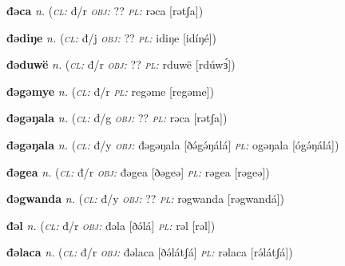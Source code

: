 \newentry
\headword\textbf{đəca}  
\ipa{[ðətʃa]}
\synpos\textit{n.} 
\class(\textit{\textsc{cl:}} {đ/r}
\object\textit{\textsc{obj:}} ??
\plural\textit{\textsc{pl:}} rəca [rətʃa])

\newentry
\headword\textbf{đədiŋe}  
\ipa{[ðədíŋé]}
\synpos\textit{n.} 
\class(\textit{\textsc{cl:}} {đ/j}
\object\textit{\textsc{obj:}} ??
\plural\textit{\textsc{pl:}} idiŋe [idíŋé])

\newentry
\headword\textbf{đəduwë}  
\ipa{[ðədúwɜ́]}
\synpos\textit{n.} 
\class(\textit{\textsc{cl:}} {đ/r}
\object\textit{\textsc{obj:}} ??
\plural\textit{\textsc{pl:}} rduwë [rdúwɜ́])

\newentry
\headword\textbf{đəgəmye}  
\ipa{[ðəgəmjé]}
\synpos\textit{n.} 
\class(\textit{\textsc{cl:}} {đ/r} %
\plural\textit{\textsc{pl:}} regəme [regəme])

\newentry
\headword\textbf{đəgəŋala}  
\ipa{[ðəgəŋala]}
\synpos\textit{n.} 
\class(\textit{\textsc{cl:}} {đ/g}
\object\textit{\textsc{obj:}} ??
\plural\textit{\textsc{pl:}} rəca [rətʃa])

\newentry
\headword\textbf{đəgəŋala}  
\ipa{[ðə́gə́ŋálá]}
\synpos\textit{n.} 
\class(\textit{\textsc{cl:}} {đ/y}
\object\textit{\textsc{obj:}} đəgəŋala [ðə́gə́ŋálá] 
\plural\textit{\textsc{pl:}} ogəŋala [ógə́ŋálá])

\newentry
\headword\textbf{đəgea}  
\ipa{[ðəgeə]}
\synpos\textit{n.} 
\class(\textit{\textsc{cl:}} {đ/r}
\object\textit{\textsc{obj:}} đəgea [ðəgeə] 
\plural\textit{\textsc{pl:}} rəgea [rəgeə])

\newentry
\headword\textbf{đəgwanda}  
\ipa{[ðəgwandá]}
\synpos\textit{n.} 
\class(\textit{\textsc{cl:}} {đ/y}
\object\textit{\textsc{obj:}} ??
\plural\textit{\textsc{pl:}} rəgwanda [rəgwandá])

\newentry
\headword\textbf{đəl}  
\ipa{[ðə́l]}
\synpos\textit{n.} 
\class(\textit{\textsc{cl:}} {đ/r}
\object\textit{\textsc{obj:}} đəla [ðə́lá]
\plural\textit{\textsc{pl:}} rəl [rəl])

\newentry
\headword\textbf{đəlaca}  
\ipa{[ðə́látʃá]}
\synpos\textit{n.} 
\class(\textit{\textsc{cl:}} {đ/r}
\object\textit{\textsc{obj:}} đəlaca [ðə́látʃá]
\plural\textit{\textsc{pl:}} rəlaca [rə́látʃá])

